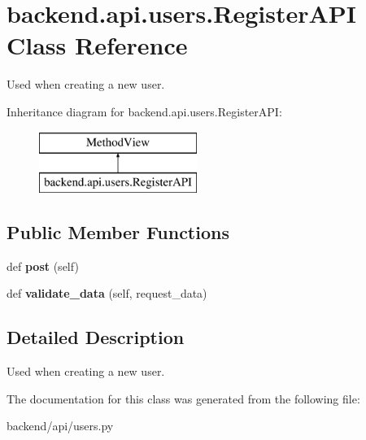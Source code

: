 \hypertarget{classbackend_1_1api_1_1users_1_1_register_a_p_i}{}\section{backend.\+api.\+users.\+Register\+A\+P\+I Class Reference}
\label{classbackend_1_1api_1_1users_1_1_register_a_p_i}


Used when creating a new user.  


Inheritance diagram for backend.\+api.\+users.\+Register\+A\+P\+I\+:\begin{figure}[H]
\begin{center}
\leavevmode
\includegraphics[height=2.000000cm]{classbackend_1_1api_1_1users_1_1_register_a_p_i}
\end{center}
\end{figure}
\subsection*{Public Member Functions}
\begin{DoxyCompactItemize}
\item 
\hypertarget{classbackend_1_1api_1_1users_1_1_register_a_p_i_abf4a3deb8f12a4d9730887919614dae1}{}def {\bfseries post} (self)\label{classbackend_1_1api_1_1users_1_1_register_a_p_i_abf4a3deb8f12a4d9730887919614dae1}

\item 
\hypertarget{classbackend_1_1api_1_1users_1_1_register_a_p_i_a1608564843140f4c308411969ef8d6a8}{}def {\bfseries validate\+\_\+data} (self, request\+\_\+data)\label{classbackend_1_1api_1_1users_1_1_register_a_p_i_a1608564843140f4c308411969ef8d6a8}

\end{DoxyCompactItemize}


\subsection{Detailed Description}
Used when creating a new user. 

The documentation for this class was generated from the following file\+:\begin{DoxyCompactItemize}
\item 
backend/api/users.\+py\end{DoxyCompactItemize}
